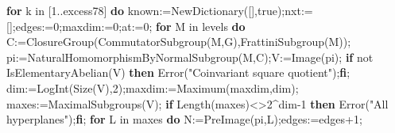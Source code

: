 \documentclass[
  10pt,
  letterpaper,
]{article}
\newenvironment{Shaded}{}{}
\newcommand{\BuiltInTok}[1]{\textcolor[rgb]{0.00,0.50,0.00}{#1}}
\newcommand{\ConstantTok}[1]{\textcolor[rgb]{0.53,0.00,0.00}{#1}}
\newcommand{\ControlFlowTok}[1]{\textcolor[rgb]{0.00,0.44,0.13}{\textbf{#1}}}
\newcommand{\ExtensionTok}[1]{#1}
\newcommand{\FloatTok}[1]{\textcolor[rgb]{0.25,0.63,0.44}{#1}}
\newcommand{\NormalTok}[1]{#1}
\newcommand{\OperatorTok}[1]{\textcolor[rgb]{0.40,0.40,0.40}{#1}}
\newcommand{\StringTok}[1]{\textcolor[rgb]{0.25,0.44,0.63}{#1}}
\newcommand{\VariableTok}[1]{\textcolor[rgb]{0.10,0.09,0.49}{#1}}
\begin{document}
\begin{Shaded}
\begin{Highlighting}[]
 \ControlFlowTok{for} \VariableTok{k} \ExtensionTok{in}\NormalTok{ [}\FloatTok{1}\OperatorTok{..}\VariableTok{excess78}\NormalTok{] }\ControlFlowTok{do}
  \VariableTok{known}\OperatorTok{:=}\BuiltInTok{NewDictionary}\NormalTok{([]}\OperatorTok{,}\ConstantTok{true}\NormalTok{)}\OperatorTok{;}\VariableTok{nxt}\OperatorTok{:=}\NormalTok{[]}\OperatorTok{;}\VariableTok{edges}\OperatorTok{:=}\FloatTok{0}\OperatorTok{;}\VariableTok{maxdim}\OperatorTok{:=}\FloatTok{0}\OperatorTok{;}\VariableTok{at}\OperatorTok{:=}\FloatTok{0}\OperatorTok{;}
  \ControlFlowTok{for} \VariableTok{M} \ExtensionTok{in} \VariableTok{levels} \ControlFlowTok{do}
   \VariableTok{C}\OperatorTok{:=}\BuiltInTok{ClosureGroup}\NormalTok{(}\BuiltInTok{CommutatorSubgroup}\NormalTok{(}\VariableTok{M}\OperatorTok{,}\VariableTok{G}\NormalTok{)}\OperatorTok{,}\BuiltInTok{FrattiniSubgroup}\NormalTok{(}\VariableTok{M}\NormalTok{))}\OperatorTok{;}
   \VariableTok{pi}\OperatorTok{:=}\BuiltInTok{NaturalHomomorphismByNormalSubgroup}\NormalTok{(}\VariableTok{M}\OperatorTok{,}\VariableTok{C}\NormalTok{)}\OperatorTok{;}\VariableTok{V}\OperatorTok{:=}\BuiltInTok{Image}\NormalTok{(}\VariableTok{pi}\NormalTok{)}\OperatorTok{;}
   \ControlFlowTok{if} \ConstantTok{not} \BuiltInTok{IsElementaryAbelian}\NormalTok{(}\VariableTok{V}\NormalTok{) }\ControlFlowTok{then} \BuiltInTok{Error}\NormalTok{(}\StringTok{"Coinvariant square quotient"}\NormalTok{)}\OperatorTok{;}\ControlFlowTok{fi}\OperatorTok{;}
   \VariableTok{dim}\OperatorTok{:=}\BuiltInTok{LogInt}\NormalTok{(}\BuiltInTok{Size}\NormalTok{(}\VariableTok{V}\NormalTok{)}\OperatorTok{,}\FloatTok{2}\NormalTok{)}\OperatorTok{;}\VariableTok{maxdim}\OperatorTok{:=}\BuiltInTok{Maximum}\NormalTok{(}\VariableTok{maxdim}\OperatorTok{,}\VariableTok{dim}\NormalTok{)}\OperatorTok{;}
   \VariableTok{maxes}\OperatorTok{:=}\BuiltInTok{MaximalSubgroups}\NormalTok{(}\VariableTok{V}\NormalTok{)}\OperatorTok{;}
   \ControlFlowTok{if} \BuiltInTok{Length}\NormalTok{(}\VariableTok{maxes}\NormalTok{)}\OperatorTok{\textless{}\textgreater{}}\FloatTok{2}\OperatorTok{\^{}}\VariableTok{dim}\OperatorTok{{-}}\FloatTok{1} \ControlFlowTok{then} \BuiltInTok{Error}\NormalTok{(}\StringTok{"All hyperplanes"}\NormalTok{)}\OperatorTok{;}\ControlFlowTok{fi}\OperatorTok{;}
   \ControlFlowTok{for} \VariableTok{L} \ExtensionTok{in} \VariableTok{maxes} \ControlFlowTok{do}
    \VariableTok{N}\OperatorTok{:=}\BuiltInTok{PreImage}\NormalTok{(}\VariableTok{pi}\OperatorTok{,}\VariableTok{L}\NormalTok{)}\OperatorTok{;}\VariableTok{edges}\OperatorTok{:=}\VariableTok{edges}\OperatorTok{+}\FloatTok{1}\OperatorTok{;}

\end{Highlighting}
\end{Shaded}
\end{document}
